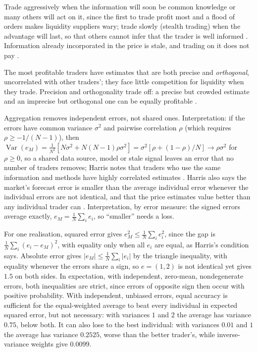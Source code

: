\begin{qfresult}
 Trade aggressively when the information will soon be common knowledge or many others will act on it, since the first to trade profit most and a flood of orders makes liquidity suppliers wary; trade slowly (stealth trading) when the advantage will last, so that others cannot infer that the trader is well informed \citep[same chap., sec.~10.4, pp.~225--226]{alpha-harris}. Information already incorporated in the price is stale, and trading on it does not pay \citep[same chap., p.~229]{alpha-harris}.

The most profitable traders have estimates that are both precise and \emph{orthogonal}, uncorrelated with other traders'; they face little competition for liquidity when they trade. Precision and orthogonality trade off: a precise but crowded estimate and an imprecise but orthogonal one can be equally profitable \citep[same chap., sec.~10.6.2.1, p.~237]{alpha-harris}.

 Aggregation removes independent errors, not shared ones. Interpretation: if the errors have common variance $\sigma^2$ and pairwise correlation $\rho$ (which requires $\rho\ge-1/(N-1)$), then $\operatorname{Var}(e_M)=\tfrac1{N^2}[N\sigma^2+N(N-1)\rho\sigma^2]=\sigma^2[\rho+(1-\rho)/N]\to\rho\sigma^2$ for $\rho\ge0$, so a shared data source, model or stale signal leaves an error that no number of traders removes; Harris notes that traders who use the same information and methods have highly correlated estimates \citep[same chap., p.~237]{alpha-harris}. Harris also says the market's forecast error is smaller than the average individual error whenever the individual errors are not identical, and that the price estimates value better than any individual trader can \citep[same chap., box, p.~225]{alpha-harris}. Interpretation, by error measure: the signed errors average exactly, $e_M=\tfrac1N\sum_ie_i$, so ``smaller'' needs a loss.

For one realisation, squared error gives $e_M^2\le\tfrac1N\sum_ie_i^2$, since the gap is $\tfrac1N\sum_i(e_i-e_M)^2$, with equality only when all $e_i$ are equal, as Harris's condition says. Absolute error gives $|e_M|\le\tfrac1N\sum_i|e_i|$ by the triangle inequality, with equality whenever the errors share a sign, so $e=(1,2)$ is not identical yet gives $1.5$ on both sides. In expectation, with independent, zero-mean, nondegenerate errors, both inequalities are strict, since errors of opposite sign then occur with positive probability. With independent, unbiased errors, equal accuracy is sufficient for the equal-weighted average to beat every individual in expected squared error, but not necessary: with variances $1$ and $2$ the average has variance $0.75$, below both. It can also lose to the best individual: with variances $0.01$ and $1$ the average has variance $0.2525$, worse than the better trader's, while inverse-variance weights give $0.0099$.


\end{qfresult}
